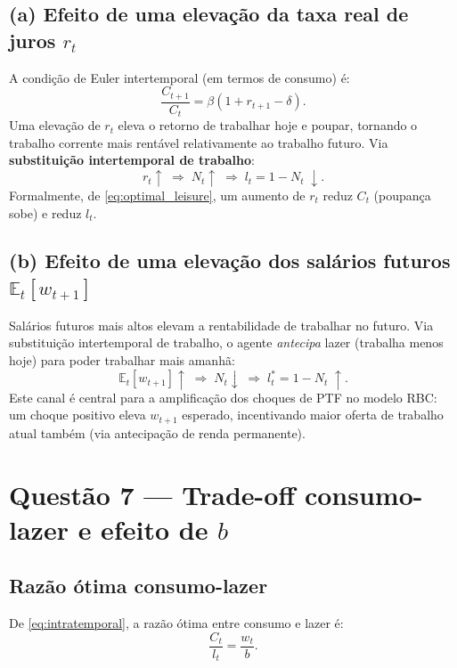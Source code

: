 \documentclass[11pt,a4paper]{article}
\newcommand{\E}{\mathbb{E}}
\begin{document}
\subsection{(a) Efeito de uma elevação da taxa real de juros $r_t$}

A condição de Euler intertemporal (em termos de consumo) é:
\begin{equation}
  \frac{C_{t+1}}{C_t} = \beta(1 + r_{t+1} - \delta).
\end{equation}
Uma elevação de $r_t$ eleva o retorno de trabalhar hoje e poupar, tornando o
trabalho corrente mais rentável relativamente ao trabalho futuro.
Via \textbf{substituição intertemporal de trabalho}:
\[
  r_t \uparrow \;\Longrightarrow\; N_t \uparrow \;\Longrightarrow\;
  l_t = 1 - N_t \;\mathbf{\downarrow}.
\]
Formalmente, de \eqref{eq:optimal_leisure}, um aumento de $r_t$ reduz $C_t$
(poupança sobe) e reduz $l_t$.

\subsection{(b) Efeito de uma elevação dos salários futuros $\E_t[w_{t+1}]$}

Salários futuros mais altos elevam a rentabilidade de trabalhar no futuro.
Via substituição intertemporal de trabalho, o agente \textit{antecipa} lazer
(trabalha menos hoje) para poder trabalhar mais amanhã:
\[
  \E_t[w_{t+1}] \uparrow \;\Longrightarrow\; N_t \downarrow \;\Longrightarrow\;
  l_t^* = 1 - N_t \;\mathbf{\uparrow}.
\]
Este canal é central para a amplificação dos choques de PTF no modelo RBC:
um choque positivo eleva $w_{t+1}$ esperado, incentivando maior oferta de
trabalho atual também (via antecipação de renda permanente).

\section{Questão 7 --- Trade-off consumo-lazer e efeito de $b$}

\subsection{Razão ótima consumo-lazer}

De \eqref{eq:intratemporal}, a razão ótima entre consumo e lazer é:
\begin{equation}\label{eq:cn_ratio}
  \boxed{\frac{C_t}{l_t} = \frac{w_t}{b}.}
\end{equation}
\end{document}
